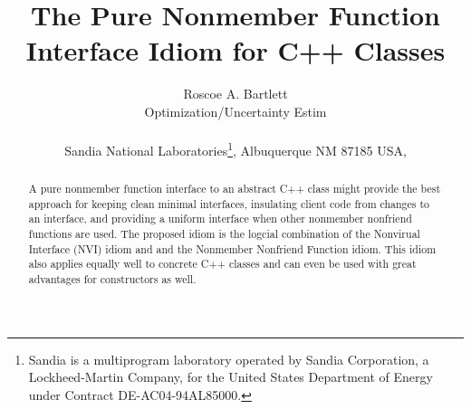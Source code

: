 \documentclass[pdf,ps2pdf,11pt]{SANDreport}
\title{\center
The Pure Nonmember Function Interface Idiom for C++ Classes}
\author{
Roscoe A. Bartlett \\ Optimization/Uncertainty Estim \\ \\ Sandia National
Laboratories\footnote{ Sandia is a multiprogram laboratory operated by Sandia
Corporation, a Lockheed-Martin Company, for the United States Department of
Energy under Contract DE-AC04-94AL85000.}, Albuquerque NM 87185 USA, \\ }
\date{}
\begin{document}
\maketitle

%

%
\begin{abstract}
%
A pure nonmember function interface to an abstract C++ class might provide the
best approach for keeping clean minimal interfaces, insulating client code
from changes to an interface, and providing a uniform interface when other
nonmember nonfriend functions are used.  The proposed idiom is the logcial
combination of the Nonvirual Interface (NVI) idiom and and the Nonmember
Nonfriend Function idiom.  This idiom also applies equally well to concrete
C++ classes and can even be used with great advantages for constructors as
well.
%
\end{abstract}
%

%
%
%

%
\clearpage
\tableofcontents

\end{document}

